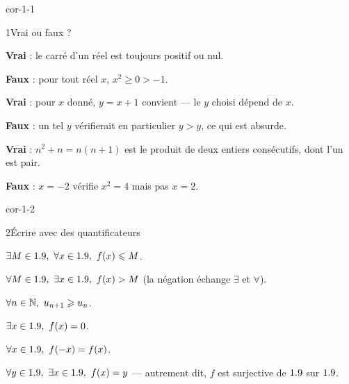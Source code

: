 
\corrigesSouples

\begin{blocLivre}{cor-1-1}
\begin{corrige}{1}{Vrai ou faux ?}
\begin{questions}
  \item \textbf{Vrai} : le carré d'un réel est toujours positif ou nul.
  \item \textbf{Faux} : pour tout réel $x$, $x^{2}\geq0>-1$.
  \item \textbf{Vrai} : pour $x$ donné, $y=x+1$ convient — le $y$ choisi dépend de $x$.
  \item \textbf{Faux} : un tel $y$ vérifierait en particulier $y>y$, ce qui est absurde.
  \item \textbf{Vrai} : $n^{2}+n=n(n+1)$ est le produit de deux entiers consécutifs, dont l'un est pair.
  \item \textbf{Faux} : $x=-2$ vérifie $x^{2}=4$ mais pas $x=2$.
\end{questions}
\end{corrige}
\end{blocLivre}

\begin{blocLivre}{cor-1-2}
\begin{corrige}{2}{Écrire avec des quantificateurs}
\begin{questions}
  \item $\exists M\in1.9,\ \forall x\in1.9,\ f(x)\leqslant M$.
  \item $\forall M\in\R,\ \exists x\in\R,\ f(x)>M$ (la négation échange $\exists$ et $\forall$).
  \item $\forall n\in\mathbb{N},\ u_{n+1}\geqslant u_n$.
  \item $\exists x\in1.9,\ f(x)=0$.
  \item $\forall x\in1.9,\ f(-x)=f(x)$.
  \item $\forall y\in\R,\ \exists x\in\R,\ f(x)=y$ — autrement dit, $f$ est surjective de $1.9$ sur $1.9$.
\end{questions}
\end{corrige}
\end{blocLivre}

